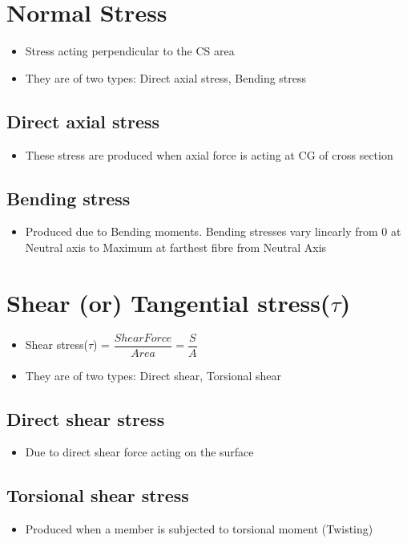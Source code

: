 \documentclass[8pt]{report}
\begin{document}
	\section{Normal Stress}
		\begin{itemize}
			\item Stress acting perpendicular to the CS area
			\item They are of two types: Direct axial stress, Bending stress
		\end{itemize}
		\subsection{Direct axial stress}
			\begin{itemize}
				\item These stress are produced when axial force is acting at CG of cross section
			\end{itemize}
		\subsection{Bending stress}
			\begin{itemize}
				\item Produced due to Bending moments. Bending stresses vary linearly from 0 at Neutral axis to Maximum at farthest fibre from Neutral Axis
			\end{itemize}\hrulefill
	\section{Shear (or) Tangential stress($\tau$)}
		\begin{itemize}
			\item Shear stress($\tau$) = $\boxed{\dfrac{ShearForce}{Area} = \dfrac{S}{A}}$
			\item They are of two types: Direct shear, Torsional shear
		\end{itemize}
		\subsection{Direct shear stress}
			\begin{itemize}
				\item Due to direct shear force acting on the surface
			\end{itemize}
		\subsection{Torsional shear stress}
			\begin{itemize}
				\item Produced when a member is subjected to torsional moment (Twisting)
			\end{itemize}\hrulefill
\end{document}
